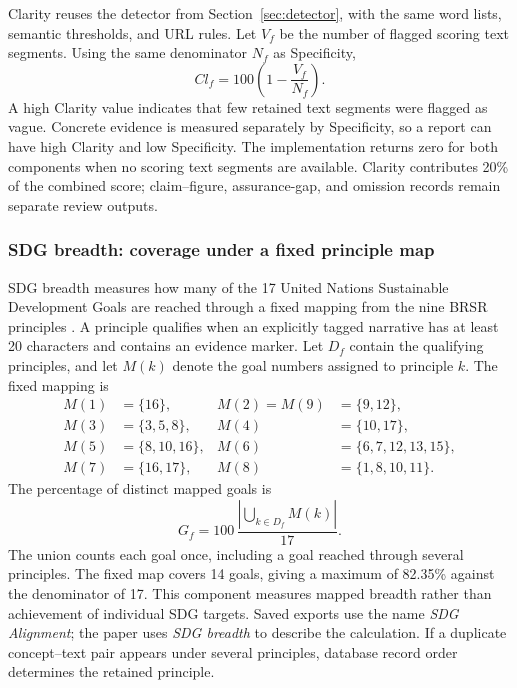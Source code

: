 Clarity reuses the detector from Section~\ref{sec:detector}, with the same word lists, semantic thresholds, and URL rules. Let $V_f$ be the number of flagged scoring text segments. Using the same denominator $N_f$ as Specificity,
\begin{equation}
Cl_f=100\left(1-\frac{V_f}{N_f}\right).
\label{eq:clarity}
\end{equation}
A high Clarity value indicates that few retained text segments were flagged as vague. Concrete evidence is measured separately by Specificity, so a report can have high Clarity and low Specificity. The implementation returns zero for both components when no scoring text segments are available. Clarity contributes 20\% of the combined score; claim--figure, assurance-gap, and omission records remain separate review outputs.

\subsubsection{SDG breadth: coverage under a fixed principle map}

SDG breadth measures how many of the 17 United Nations Sustainable Development Goals are reached through a fixed mapping from the nine BRSR principles \cite{un2015}. A principle qualifies when an explicitly tagged narrative has at least 20 characters and contains an evidence marker. Let $D_f$ contain the qualifying principles, and let $M(k)$ denote the goal numbers assigned to principle $k$. The fixed mapping is
\[
\begin{aligned}
M(1)&=\{16\}, & M(2)=M(9)&=\{9,12\},\\
M(3)&=\{3,5,8\}, & M(4)&=\{10,17\},\\
M(5)&=\{8,10,16\}, & M(6)&=\{6,7,12,13,15\},\\
M(7)&=\{16,17\}, & M(8)&=\{1,8,10,11\}.
\end{aligned}
\]
The percentage of distinct mapped goals is
\begin{equation}
G_f=100\,\frac{\left|\bigcup_{k\in D_f}M(k)\right|}{17}.
\label{eq:sdg}
\end{equation}
The union counts each goal once, including a goal reached through several principles. The fixed map covers 14 goals, giving a maximum of 82.35\% against the denominator of 17. This component measures mapped breadth rather than achievement of individual SDG targets. Saved exports use the name \emph{SDG Alignment}; the paper uses \emph{SDG breadth} to describe the calculation. If a duplicate concept--text pair appears under several principles, database record order determines the retained principle.

